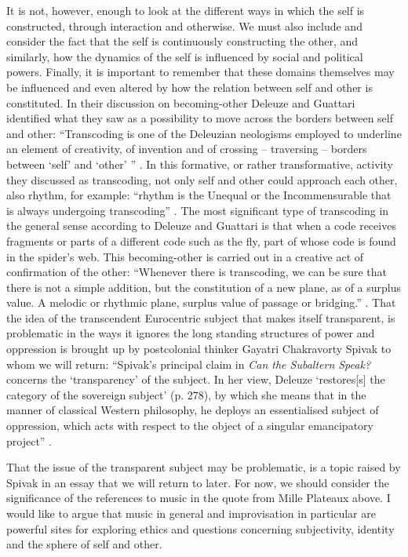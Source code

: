 \documentclass[a4paper]{article}
\begin{document}
It is not, however, enough to look at the different ways in which the self is constructed, through interaction and otherwise. We must also include and consider the fact that the self is continuously constructing the other, and similarly, how the dynamics of the self is influenced by social and political powers. Finally, it is important to remember that these domains themselves may be influenced and even altered by how the relation between self and other is constituted. In their discussion on becoming-other Deleuze and Guattari identified what they saw as a possibility to move across the borders between self and other: ``Transcoding is one of the Deleuzian neologisms employed to underline an element of creativity, of invention and of crossing – traversing – borders between `self' and `other' '' \citep[][p. 140]{semetsky2011}. In this formative, or rather transformative, activity they discussed as transcoding, not only self and other could approach each other, also rhythm, for example: ``rhythm is the Unequal or the Incommensurable that is always undergoing transcoding'' \citep[p. 346]{deleuze80}. The most significant type of transcoding in the general sense according to Deleuze and Guattari is that when a code receives fragments or parts of a different code such as the fly, part of whose code is found in the spider's web. This becoming-other is carried out in a creative act of confirmation of the other: ``Whenever there is transcoding, we can be sure that there is not a simple addition, but the constitution of a new plane, as of a surplus value. A melodic or rhythmic plane, surplus value of passage or bridging.'' \citep[p. 346]{deleuze80}. That the idea of the transcendent Eurocentric subject that makes itself transparent, is problematic in the ways it ignores the long standing structures of power and oppression is brought up by postcolonial thinker Gayatri Chakravorty Spivak to whom we will return: ``Spivak's principal claim in \emph{Can the Subaltern Speak?} concerns the `transparency' of the subject. In her view, Deleuze `restores[s] the category of the sovereign subject' (p. 278), by which she means that in the manner of classical Western philosophy, he deploys an essentialised subject of oppression, which acts with respect to the object of a singular emancipatory project'' \citep[][(citations from Spivak, 1988)]{robinson2010}.

That the issue of the transparent subject may be problematic, is a topic raised by Spivak in an essay that we will return to later. For now, we should consider the significance of the references to music in the quote from Mille Plateaux above. I would like to argue that music in general and improvisation in particular are powerful sites for exploring ethics and questions concerning subjectivity, identity and the sphere of self and other.
\end{document}
